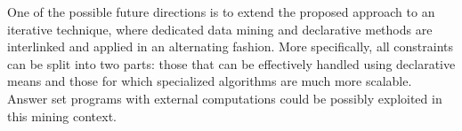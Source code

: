 One of the possible future directions is to extend the proposed approach to an iterative technique, where dedicated data mining and declarative methods are interlinked and applied in an alternating fashion. More specifically, all constraints can be split into two parts: those that can be effectively handled using declarative means and those for which specialized algorithms are much more scalable. Answer set programs with external computations \parencite{hp} could be possibly exploited in this mining context. %




